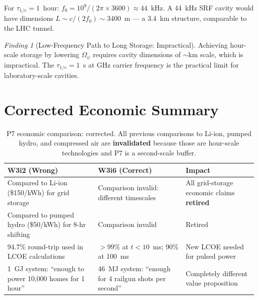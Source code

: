 \documentclass[11pt]{article}
\theoremstyle{definition}
\theoremstyle{remark}
\newtheorem{finding}[theorem]{Finding}
\newcommand{\Opsi}{\Omega_\psi}
\begin{document}
For $\tau_{1/e} = 1$~hour: $f_0 = 10^9/(2\pi \times 3600)
\approx 44$~kHz. A 44~kHz SRF cavity would have dimensions
$L \sim c/(2f_0) \sim 3400$~m --- a 3.4~km structure, comparable to the
LHC tunnel.

\begin{finding}[Low-Frequency Path to Long Storage: Impractical]
\label{finding:low-freq}
Achieving hour-scale storage by lowering $\Opsi$ requires cavity
dimensions of $\sim$km scale, which is impractical. The
$\tau_{1/e} = 1$~s at GHz carrier frequency is the practical limit for
laboratory-scale cavities.
\end{finding}

\section{Corrected Economic Summary}
\label{sec:P7-economics}

\begin{table}[h]
\centering
\caption{P7 economic comparison: corrected. All previous comparisons
to Li-ion, pumped hydro, and compressed air are \textbf{invalidated}
because those are hour-scale technologies and P7 is a second-scale buffer.}
\label{tab:P7-economics}
\begin{tabular}{@{}p{4cm}p{4cm}p{4cm}@{}}
\toprule
\textbf{W3i2 (Wrong)} & \textbf{W3i6 (Correct)} & \textbf{Impact} \\
\midrule
Compared to Li-ion (\$150/kWh) for grid storage
  & Comparison invalid: different timescales
  & All grid-storage economic claims \textbf{retired} \\[6pt]
Compared to pumped hydro (\$50/kWh) for 8-hr shifting
  & Comparison invalid
  & Retired \\[6pt]
94.7\% round-trip used in LCOE calculations
  & $> 99\%$ at $t < 10$~ms; 90\% at 100~ms
  & New LCOE needed for pulsed power \\[6pt]
1~GJ system: ``enough to power 10,000 homes for 1 hour''
  & 46~MJ system: ``enough for 4 railgun shots per second''
  & Completely different value proposition \\
\bottomrule
\end{tabular}
\end{table}
\end{document}
